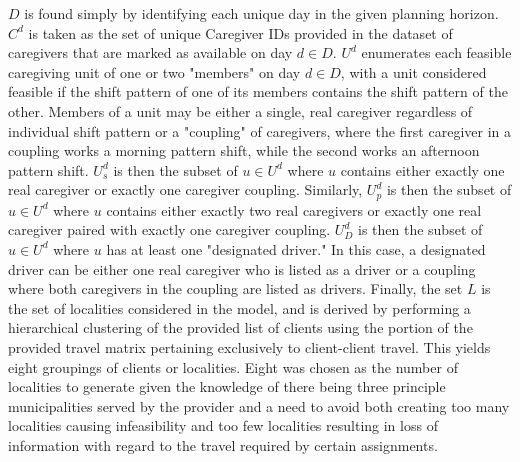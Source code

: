 \documentclass[11pt,twoside]{article}
\numberwithin{Theorem}{section}
\numberwithin{Definition}{section}
\numberwithin{Lemma}{section}
\numberwithin{Algorithm}{section}
\numberwithin{equation}{section}
\begin{document}
$D$ is found simply by identifying each unique day in the given planning horizon. $C^d$ is taken as the set of unique Caregiver IDs provided in the dataset of caregivers that are marked as available on day $d \in D$. $U^d$ enumerates each feasible caregiving unit of one or two "members" on day $d \in D$, with a unit considered feasible if the shift pattern of one of its members contains the shift pattern of the other. Members of a unit may be either a single, real caregiver regardless of individual shift pattern or a "coupling" of caregivers, where the first caregiver in a coupling works a morning pattern shift, while the second works an afternoon pattern shift. $U_s^d$ is then the subset of $u \in U^d$ where $u$ contains either exactly one real caregiver or exactly one caregiver coupling. Similarly, $U_p^d$ is then the subset of $u \in U^d$ where $u$ contains either exactly two real caregivers or exactly one real caregiver paired with exactly one caregiver coupling. $U_D^d$ is then the subset of $u \in U^d$ where $u$ has at least one "designated driver." In this case, a designated driver can be either one real caregiver who is listed as a driver or a coupling where both caregivers in the coupling are listed as drivers. Finally, the set $L$ is the set of localities considered in the model, and is derived by performing a hierarchical clustering of the provided list of clients using the portion of the provided travel matrix pertaining exclusively to client-client travel. This yields eight groupings of clients or localities. Eight was chosen as the number of localities to generate given the knowledge of there being three principle municipalities served by the provider and a need to avoid both creating too many localities causing infeasibility and too few localities resulting in loss of information with regard to the travel required by certain assignments.
\end{document}
